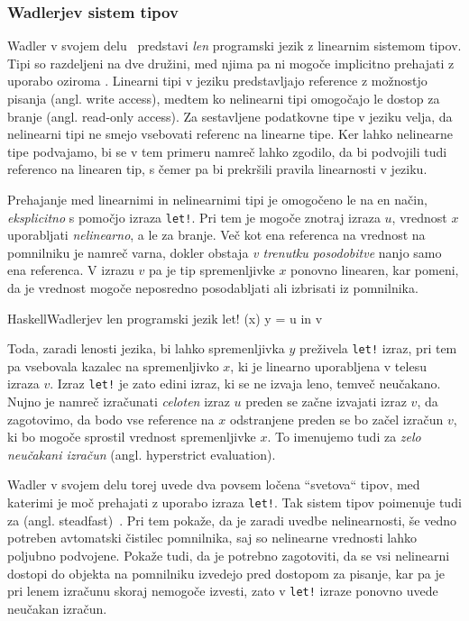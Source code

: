 \subsubsection{Wadlerjev sistem  tipov}
Wadler v svojem delu~\cite{wadler1990linear} predstavi \textit{len} programski jezik z linearnim sistemom tipov. Tipi so razdeljeni na dve družini, med njima pa ni mogoče implicitno prehajati z uporabo  oziroma . Linearni tipi v jeziku predstavljajo reference z možnostjo pisanja (angl. write access), medtem ko nelinearni tipi omogočajo le dostop za branje (angl. read-only access). Za sestavljene podatkovne tipe v jeziku velja, da nelinearni tipi ne smejo vsebovati referenc na linearne tipe. Ker lahko nelinearne tipe podvajamo, bi se v tem primeru namreč lahko zgodilo, da bi podvojili tudi referenco na linearen tip, s čemer pa bi prekršili pravila linearnosti v jeziku.

Prehajanje med linearnimi in nelinearnimi tipi je omogočeno le na en način, \textit{eksplicitno} s pomočjo izraza \texttt{let!}. Pri tem je mogoče znotraj izraza $u$, vrednost $x$ uporabljati \textit{nelinearno}, a le za branje. Več kot ena referenca na vrednost na pomnilniku je namreč varna, dokler obstaja \textit{v trenutku posodobitve} nanjo samo ena referenca. V izrazu $v$ pa je tip spremenljivke $x$ ponovno linearen, kar pomeni, da je vrednost mogoče neposredno posodabljati ali izbrisati iz pomnilnika.

\begin{code-box}{Haskell}{Wadlerjev len programski jezik}
let! (x) y = u in v
\end{code-box}

Toda, zaradi lenosti jezika, bi lahko spremenljivka $y$ preživela \texttt{let!} izraz, pri tem pa vsebovala kazalec na spremenljivko $x$, ki je linearno uporabljena v telesu izraza $v$. Izraz \texttt{let!} je zato edini izraz, ki se ne izvaja leno, temveč neučakano. Nujno je namreč izračunati \textit{celoten} izraz $u$ preden se začne izvajati izraz $v$, da zagotovimo, da bodo vse reference na $x$ odstranjene preden se bo začel izračun $v$, ki bo mogoče sprostil vrednost spremenljivke $x$. To imenujemo tudi za \textit{zelo neučakani izračun} (angl. hyperstrict evaluation).

Wadler v svojem delu torej uvede dva povsem ločena ``svetova`` tipov, med katerimi je moč prehajati z uporabo izraza \texttt{let!}. Tak sistem tipov poimenuje tudi za  (angl. steadfast)~\cite{wadler1991there}. Pri tem pokaže, da je zaradi uvedbe nelinearnosti, še vedno potreben avtomatski čistilec pomnilnika, saj so nelinearne vrednosti lahko poljubno podvojene. Pokaže tudi, da je potrebno zagotoviti, da se vsi nelinearni dostopi do objekta na pomnilniku izvedejo pred dostopom za pisanje, kar pa je pri lenem izračunu skoraj nemogoče izvesti, zato v \texttt{let!} izraze ponovno uvede neučakan izračun.

